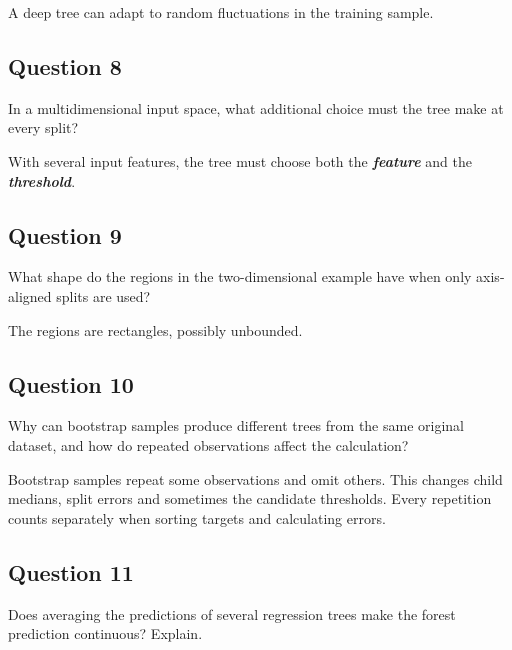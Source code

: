 \documentclass[10pt]{article}
\begin{document}
\begingroup\color{red}

A deep tree can adapt to random fluctuations in the training sample.

\par\endgroup

\subsection*{Question 8}
In a multidimensional input space, what additional choice must the tree make at every split?

\begingroup\color{red}

With several input features, the tree must choose both the
\textbf{\textit{feature}} and the \textbf{\textit{threshold}}.

\par\endgroup

\subsection*{Question 9}
What shape do the regions in the two-dimensional example have when only axis-aligned splits are used?

\begingroup\color{red}

The regions are rectangles, possibly unbounded.

\par\endgroup

\subsection*{Question 10}
Why can bootstrap samples produce different trees from the same original dataset, and how do repeated observations affect the calculation?

\begingroup\color{red}

Bootstrap samples repeat some observations and omit others. This
changes child medians, split errors and sometimes the candidate
thresholds. Every repetition counts separately when sorting targets
and calculating errors.

\par\endgroup

\subsection*{Question 11}
Does averaging the predictions of several regression trees make the forest prediction continuous? Explain.
\end{document}
